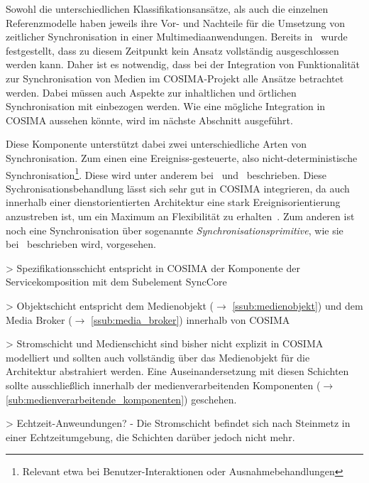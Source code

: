 
  Sowohl die unterschiedlichen Klassifikationsansätze, als auch die einzelnen Referenzmodelle haben jeweils ihre Vor- und Nachteile für die Umsetzung von zeitlicher Synchronisation in einer Multimediaanwendungen. Bereits in~\citep[S. 28ff]{bericht} wurde festgestellt, dass zu diesem Zeitpunkt kein Ansatz vollständig ausgeschlossen werden kann. Daher ist es notwendig, dass bei der Integration von Funktionalität zur Synchronisation von Medien im COSIMA-Projekt alle Ansätze betrachtet werden. Dabei müssen auch Aspekte zur inhaltlichen und örtlichen Synchronisation mit einbezogen werden. Wie eine mögliche Integration in COSIMA aussehen könnte, wird im nächste Abschnitt ausgeführt.

  
\label{msec:umsetzung_in_cosima}
  
  Diese Komponente unterstützt dabei zwei unterschiedliche Arten von Synchronisation. Zum einen eine Ereigniss-gesteuerte, also nicht-deterministische Synchronisation\footnote{Relevant etwa bei Benutzer-Interaktionen oder Ausnahmebehandlungen}. Diese wird unter anderem bei~\citep{little1991ms} und~\citep{bertino1998tsm} beschrieben. Diese Sychronisationsbehandlung lässt sich sehr gut in COSIMA integrieren, da auch innerhalb einer dienstorientierten Architektur eine stark Ereignisorientierung anzustreben ist, um ein Maximum an Flexibilität zu erhalten~\citep[S. 96]{masak2007ssb}. Zum anderen ist noch eine Synchronisation über sogenannte \emph{Synchronisationsprimitive}, wie sie bei~\citep{gaggi2005msh} beschrieben wird, vorgesehen.
  
  > Spezifikationsschicht entspricht in COSIMA der Komponente der Servicekomposition mit dem Subelement SyncCore
  
  > Objektschicht entspricht dem Medienobjekt ($\to$ \ref{ssub:medienobjekt}) und dem Media Broker ($\to$ \ref{ssub:media_broker}) innerhalb von COSIMA
  
  > Stromschicht und Medienschicht sind bisher nicht explizit in COSIMA modelliert und sollten auch vollständig über das Medienobjekt für die Architektur abstrahiert werden. Eine Auseinandersetzung mit diesen Schichten sollte ausschließlich innerhalb der medienverarbeitenden Komponenten ($\to$ \ref{sub:medienverarbeitende_komponenten}) geschehen.

  > Echtzeit-Anweundungen? - Die Stromschicht befindet sich nach Steinmetz in einer Echtzeitumgebung, die Schichten darüber jedoch nicht mehr.

